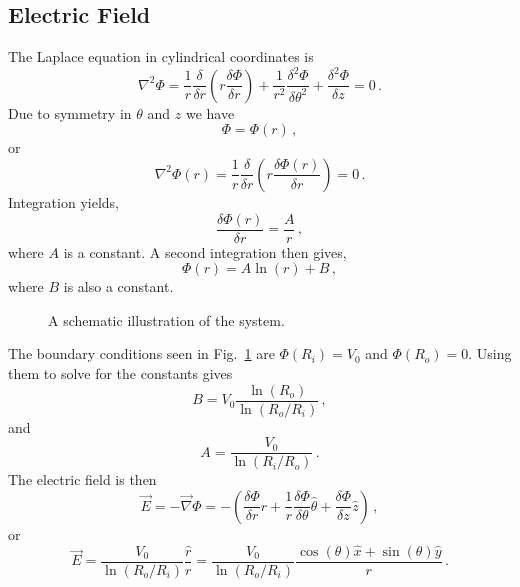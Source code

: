 \documentclass[a4paper,10pt]{article}
\begin{document}
\subsection{Electric Field}
The Laplace equation in cylindrical coordinates is
\begin{equation}
 \nabla^2\Phi = \frac{1}{r}\frac{\delta}{\delta r}\left( r \frac{\delta\Phi}{\delta r}\right)
              + \frac{1}{r^2}\frac{\delta^2\Phi}{\delta \theta^2} + \frac{\delta^2\Phi}{\delta z} = 0\, .
\end{equation}
Due to symmetry in \(\theta\) and \(z\) we have
\begin{equation}
 \Phi = \Phi(r)\, ,
\end{equation}
or
\begin{equation}
 \nabla^2\Phi(r) = \frac{1}{r}\frac{\delta}{\delta r}\left( r \frac{\delta\Phi(r)}{\delta r}\right) = 0\, .
\end{equation}
Integration yields,
\begin{equation}
  \frac{\delta \Phi(r)}{\delta r} = \frac{A}{r}\, ,
\end{equation}
where \(A\) is a constant. A second integration then gives,
\begin{equation}
  \Phi(r) = A\ln(r) + B\, ,
\end{equation}
where \(B\) is also a constant.
\begin{figure}[!h]
  \centering
  \caption{A schematic illustration of the system.}
  \label{fig:system}
\end{figure}
The boundary conditions seen in Fig.~\ref{fig:system} are \(\Phi(R_i) = V_0\) and \(\Phi(R_o) = 0\). Using them to solve for the constants gives
\begin{equation}
  B = V_0\frac{\ln(R_o)}{\ln(R_o/R_i)}\, ,
\end{equation}
and
\begin{equation}
  A = \frac{V_0}{\ln(R_i/R_o)}\, .
\end{equation}
The electric field is then
\begin{equation}
 \vec{E} = - \vec{\nabla}\Phi
 = -\left(\frac{\delta \Phi}{\delta r}\hat{r} + \frac{1}{r}\frac{\delta\Phi}{\delta \theta}\hat{\theta} + \frac{\delta\Phi}{\delta z}\hat{z} \right)\, ,
\end{equation}
or
\begin{equation}
 \vec{E} = \frac{V_0}{\ln(R_o/R_i)}\frac{\hat{r}}{r}
         = \frac{V_0}{\ln(R_o/R_i)} \frac{\cos(\theta)\hat{x} + \sin(\theta)\hat{y}}{r}\, .
\end{equation}
\end{document}
